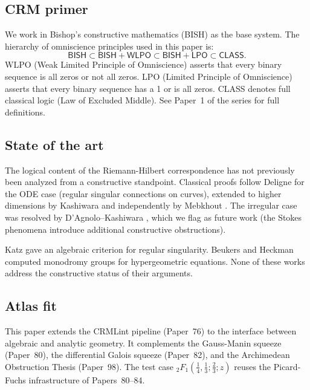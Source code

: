 \documentclass[11pt,a4paper]{article}
\theoremstyle{plain}
\theoremstyle{definition}
\newcommand{\BISH}{\textsf{BISH}}
\newcommand{\WLPO}{\textsf{WLPO}}
\newcommand{\LPO}{\textsf{LPO}}
\newcommand{\CLASS}{\textsf{CLASS}}
\newcommand{\CRM}{\textsf{CRM}}
\begin{document}
\subsection{\CRM{} primer}

We work in Bishop's constructive mathematics (\BISH) as the base system.
The hierarchy of omniscience principles used in this paper is:
\[
\BISH \subset \BISH + \WLPO \subset \BISH + \LPO \subset \CLASS.
\]
\WLPO{} (Weak Limited Principle of Omniscience) asserts that every binary sequence is all zeros or not all zeros.
\LPO{} (Limited Principle of Omniscience) asserts that every binary sequence has a 1 or is all zeros.
\CLASS{} denotes full classical logic (Law of Excluded Middle).
See Paper~1 of the series \cite{Paper1} for full definitions.

\subsection{State of the art}

The logical content of the Riemann-Hilbert correspondence has not previously been analyzed from a constructive standpoint.
Classical proofs follow Deligne \cite{Deligne1970} for the ODE case (regular singular connections on curves), extended to higher dimensions by Kashiwara \cite{Kashiwara1984} and independently by Mebkhout \cite{Mebkhout1980}.
The irregular case was resolved by D'Agnolo--Kashiwara \cite{DAgnoloKashiwara2016}, which we flag as future work (the Stokes phenomena introduce additional constructive obstructions).

Katz \cite{Katz1970} gave an algebraic criterion for regular singularity.
Beukers and Heckman \cite{BeukersHeckman1989} computed monodromy groups for hypergeometric equations.
None of these works address the constructive status of their arguments.

\subsection{Atlas fit}

This paper extends the CRMLint pipeline (Paper~76) to the interface between algebraic and analytic geometry.
It complements the Gauss-Manin squeeze (Paper~80), the differential Galois squeeze (Paper~82), and the Archimedean Obstruction Thesis (Paper~98).
The test case ${}_2F_1(\tfrac{1}{4}, \tfrac{1}{3}; \tfrac{2}{3}; z)$ reuses the Picard-Fuchs infrastructure of Papers~80--84.

\end{document}
